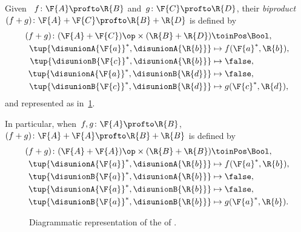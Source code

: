 \begin{definition}
    \label{def:biproduct-dp}
    Given ~$f\colon \F{A} \profto \R{B}$ and~$g\colon \F{C} \profto \R{D}$, their \emph{biproduct}~$(f + g)\colon \F{A} + \F{C} \profto \R{B} + \R{D}$ is defined by
    \begin{equation}
        \begin{aligned}
            (f + g)
            \colon (\F{A} + \F{C})\op \times (\R{B} + \R{D}) & \toinPos \Bool, \\
            \tup{\disunionA{\F{a}}^*, \disunionA{\R{b}}}     & \mapsto f(\F{a}^*, \R{b}), \\
            \tup{\disunionB{\F{c}}^*, \disunionA{\R{b}}}     & \mapsto \false, \\
            \tup{\disunionA{\F{a}}^*, \disunionB{\R{d}}}     & \mapsto \false, \\
            \tup{\disunionB{\F{c}}^*, \disunionB{\R{d}}}     & \mapsto g(\F{c}^*, \R{d}),
        \end{aligned}
    \end{equation}
    and represented as in~\cref{fig:biproductdp}.

    In particular, when~$f, g\colon \F{A} \profto \R{B}$,~$(f + g)\colon \F{A} + \F{A} \profto \R{B} + \R{B}$ is defined by
    \begin{equation}
        \begin{aligned}
            (f + g)
            \colon (\F{A} + \F{A})\op \times (\R{B} + \R{B}) & \toinPos \Bool, \\
            \tup{\disunionA{\F{a}}^*, \disunionA{\R{b}}}     & \mapsto f(\F{a}^*, \R{b}), \\
            \tup{\disunionB{ \F{a}}^*, \disunionA{\R{b}}}    & \mapsto \false, \\
            \tup{\disunionA{\F{a}}^*, \disunionB{ \R{b}}}    & \mapsto \false, \\
            \tup{\disunionB{ \F{a}}^*, \disunionB{ \R{b}}}   & \mapsto g(\F{a}^*, \R{b}).
        \end{aligned}
    \end{equation}
\end{definition}

\begin{figure}[h!]
    \begin{center}
    \end{center}
    \caption{Diagrammatic representation of the  of . }
    \label{fig:biproductdp}
\end{figure}

